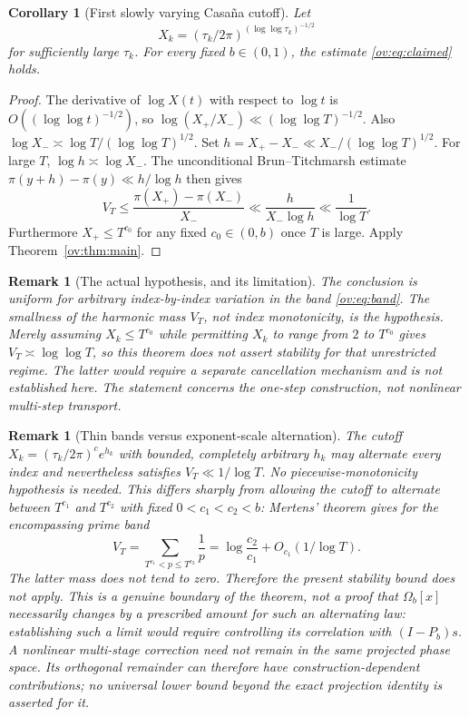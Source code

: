 \documentclass[11pt,reqno]{amsart}
\numberwithin{equation}{section}
\newtheorem{corollary}[theorem]{Corollary}
\newtheorem{remark}[theorem]{Remark}
\begin{document}
\begin{corollary}[First slowly varying Casa\~na cutoff]\label{ov:cor:slow}
Let
\begin{equation}
X_k=(\tau_k/2\pi)^{(\log\log\tau_k)^{-1/2}}
\end{equation}
for sufficiently large $\tau_k$. For every fixed $b\in(0,1)$, the estimate \eqref{ov:eq:claimed} holds.
\end{corollary}
\begin{proof}
The derivative of $\log X(t)$ with respect to $\log t$ is $O((\log\log t)^{-1/2})$, so $\log(X_+/X_-)\ll(\log\log T)^{-1/2}$. Also $\log X_-\asymp\log T/(\log\log T)^{1/2}$. Set $h=X_+-X_-\ll X_-/(\log\log T)^{1/2}$. For large $T$, $\log h\asymp\log X_-$. The unconditional Brun--Titchmarsh estimate $\pi(y+h)-\pi(y)\ll h/\log h$ then gives
\[
V_T\le\frac{\pi(X_+)-\pi(X_-)}{X_-}
\ll\frac{h}{X_-\log h}\ll\frac1{\log T}.
\]
Furthermore $X_+\le T^{c_0}$ for any fixed $c_0\in(0,b)$ once $T$ is large. Apply Theorem~\ref{ov:thm:main}.
\end{proof}

\begin{remark}[The actual hypothesis, and its limitation]
The conclusion is \emph{uniform for arbitrary index-by-index variation} in the band \eqref{ov:eq:band}. The smallness of the harmonic mass $V_T$, not index monotonicity, is the hypothesis. Merely assuming $X_k\le T^{c_0}$ while permitting $X_k$ to range from $2$ to $T^{c_0}$ gives $V_T\asymp\log\log T$, so this theorem does \emph{not} assert stability for that unrestricted regime. The latter would require a separate cancellation mechanism and is not established here. The statement concerns the one-step construction, not nonlinear multi-step transport.
\end{remark}

\begin{remark}[Thin bands versus exponent-scale alternation]
\label{ov:rem:contrast}
The cutoff $X_k=(\tau_k/2\pi)^c e^{h_k}$ with bounded, completely
arbitrary $h_k$ may alternate every index and nevertheless satisfies
$V_T\ll1/\log T$. No piecewise-monotonicity hypothesis is needed.
This differs sharply from allowing the cutoff to alternate between
$T^{c_1}$ and $T^{c_2}$ with fixed $0<c_1<c_2<b$:
Mertens' theorem gives for the encompassing prime band
\begin{equation}
 V_T=\sum_{T^{c_1}<p\le T^{c_2}}\frac1p
     =\log\frac{c_2}{c_1}+O_{c_1}(1/\log T).
 \label{ov:eq:wideband}
\end{equation}
The latter mass does not tend to zero. Therefore the present
stability bound does not apply. This is a genuine \emph{boundary
of the theorem}, not a proof that $\Omega_b[x]$ necessarily changes
by a prescribed amount for such an alternating law: establishing
such a limit would require controlling its correlation with
$(I-P_b)s$.
A nonlinear multi-stage correction need not remain in the same
projected phase space. Its orthogonal remainder can therefore
have construction-dependent contributions; no universal lower
bound beyond the exact projection identity is asserted for it.
\end{remark}
\end{document}
